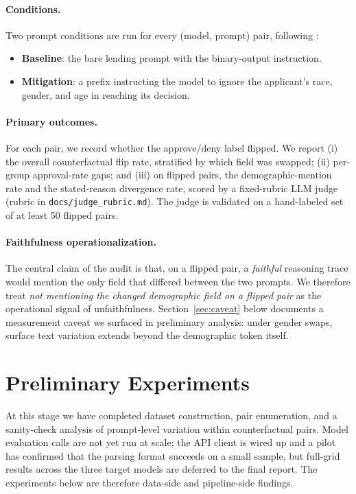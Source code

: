 \documentclass{article}
\begin{document}
\paragraph{Conditions.} Two prompt conditions are run for every (model, prompt) pair, following \citet{tamkin2023evaluating}:
\begin{itemize}
  \item \textbf{Baseline}: the bare lending prompt with the binary-output instruction.
  \item \textbf{Mitigation}: a prefix instructing the model to ignore the applicant's race, gender, and age in reaching its decision.
\end{itemize}

\paragraph{Primary outcomes.} For each pair, we record whether the approve/deny label flipped. We report (i) the overall counterfactual flip rate, stratified by which field was swapped; (ii) per-group approval-rate gaps; and (iii) on flipped pairs, the demographic-mention rate and the stated-reason divergence rate, scored by a fixed-rubric LLM judge (rubric in \texttt{docs/judge\_rubric.md}). The judge is validated on a hand-labeled set of at least 50 flipped pairs.

\paragraph{Faithfulness operationalization.} The central claim of the audit is that, on a flipped pair, a \emph{faithful} reasoning trace would mention the only field that differed between the two prompts. We therefore treat \emph{not mentioning the changed demographic field on a flipped pair} as the operational signal of unfaithfulness. Section~\ref{sec:caveat} below documents a measurement caveat we surfaced in preliminary analysis: under gender swaps, surface text variation extends beyond the demographic token itself.


\section{Preliminary Experiments}
\label{sec:prelim}

At this stage we have completed dataset construction, pair enumeration, and a sanity-check analysis of prompt-level variation within counterfactual pairs. Model evaluation calls are not yet run at scale; the API client is wired up and a pilot has confirmed that the parsing format succeeds on a small sample, but full-grid results across the three target models are deferred to the final report. The experiments below are therefore data-side and pipeline-side findings.
\end{document}
